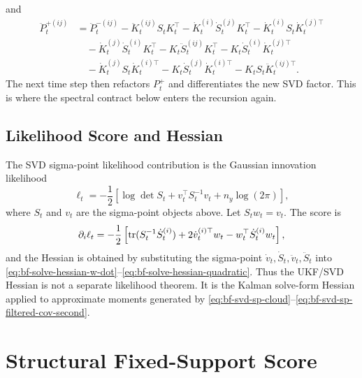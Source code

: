 and
\begin{align}
\label{eq:bf-svd-sp-filtered-cov-second}
  \ddot P_t^{+(ij)}
  &=
  \ddot P_t^{-(ij)}
  -\ddot K_t^{(ij)}S_tK_t^\top
  -\dot K_t^{(i)}\dot S_t^{(j)}K_t^\top
  -\dot K_t^{(i)}S_t\dot K_t^{(j)\top} \nonumber\\
  &\quad
  -\dot K_t^{(j)}\dot S_t^{(i)}K_t^\top
  -K_t\ddot S_t^{(ij)}K_t^\top
  -K_t\dot S_t^{(i)}\dot K_t^{(j)\top} \nonumber\\
  &\quad
  -\dot K_t^{(j)}S_t\dot K_t^{(i)\top}
  -K_t\dot S_t^{(j)}\dot K_t^{(i)\top}
  -K_tS_t\ddot K_t^{(ij)\top}.
\end{align}
The next time step then refactors $P_t^+$ and differentiates the new SVD factor.
This is where the spectral contract below enters the recursion again.

\subsection{Likelihood Score and Hessian}
\label{sec:bf-svd-sp-likelihood-derivatives}

The SVD sigma-point likelihood contribution is the Gaussian innovation
likelihood
\[
  \ell_t
  =
  -\frac{1}{2}
  \left[
    \log\det S_t+v_t^\top S_t^{-1}v_t+n_y\log(2\pi)
  \right],
\]
where $S_t$ and $v_t$ are the sigma-point objects above.  Let
$S_tw_t=v_t$.  The score is
\begin{equation}
\label{eq:bf-svd-sp-score}
  \partial_i\ell_t
  =
  -\frac{1}{2}
  \left[
    \operatorname{tr}(S_t^{-1}\dot S_t^{(i)})
    +2\dot v_t^{(i)\top}w_t
    -w_t^\top\dot S_t^{(i)}w_t
  \right],
\end{equation}
and the Hessian is obtained by substituting the sigma-point
$\dot v_t,\dot S_t,\ddot v_t,\ddot S_t$ into
\eqref{eq:bf-solve-hessian-w-dot}--\eqref{eq:bf-solve-hessian-quadratic}.
Thus the UKF/SVD Hessian is not a separate likelihood theorem.  It is the
Kalman solve-form Hessian applied to approximate moments generated by
\eqref{eq:bf-svd-sp-cloud}--\eqref{eq:bf-svd-sp-filtered-cov-second}.

\section{Structural Fixed-Support Score}
\label{sec:bf-svd-sp-structural-fixed-support-score}

